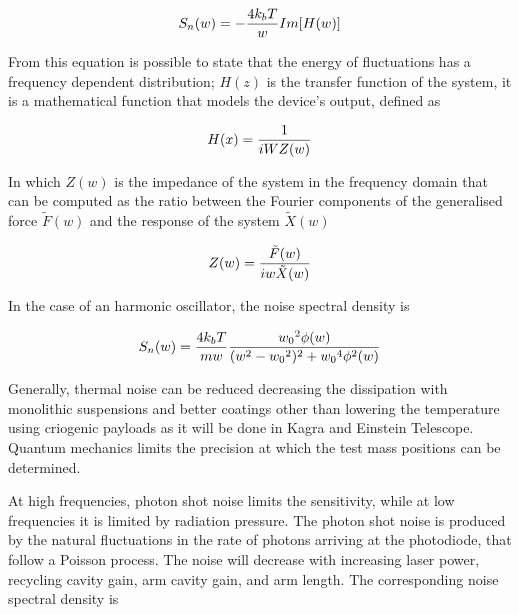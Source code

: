 \documentclass[binding=0.6cm, LaM]{sapthesis}
\begin{document}
                \begin{equation}
                S_{n}(w) = - {{4k_bT} \over {w}} Im[H(w)]
                \end{equation}

        From this equation is possible to state that the energy of fluctuations has a frequency dependent distribution;
        $H(z)$ is the transfer function of the system, it is a mathematical function that models the device’s output, defined as

                \begin{equation}
                H(x) = {1 \over {iWZ(w)}}
                \end{equation}

        In which $Z(w)$ is the impedance of the system in the frequency domain that can be computed as the ratio
        between the Fourier components of the generalised force $\tilde F(w)$ and the response of the system $\tilde X(w)$

                \begin{equation}
                Z(w) = {{\tilde F(w)} \over {iw \tilde X(w)}}
                \end{equation}

        In the case of an harmonic oscillator, the noise spectral density is

                \begin{equation}
                S_n(w) = {{4k_bT} \over {mw}} {{{w_0}^2 \phi(w)} \over {(w^2-{w_0}^2)^2 + {w_0}^4 \phi^2(w)}}
		\end{equation} 

	Generally, thermal noise can be reduced decreasing the dissipation with monolithic suspensions and better coatings
        other than lowering the temperature using criogenic payloads as it will be done in Kagra and Einstein Telescope. \\
        Quantum mechanics limits the precision at which the test mass positions can be determined. 

        At high frequencies, photon shot noise limits the sensitivity, 
	while at low frequencies it is limited by radiation pressure.
        The photon shot noise is produced by the natural fluctuations in the rate of photons arriving at the photodiode,
        that follow a Poisson process. The noise will decrease with increasing laser power,
        recycling cavity gain, arm cavity gain, and arm length.
        The corresponding noise spectral density is
\end{document}
